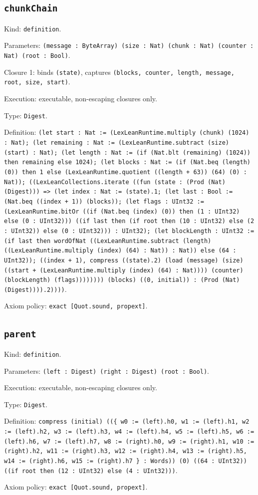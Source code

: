 \documentclass[11pt]{article}
\begin{document}
\subsection*{\texttt{chunkChain}}
\noindent Kind: \texttt{definition}.\par
\noindent Parameters: \texttt{(message : ByteArray) (size : Nat) (chunk : Nat) (counter : Nat) (root : Bool)}.\par
\noindent Closure 1: binds \texttt{(state)}, captures \texttt{(blocks, counter, length, message, root, size, start)}.\par
\noindent Execution: executable, non-escaping closures only.\par
\noindent Type: \texttt{Digest}.\par
\noindent Definition: \texttt{(let start : Nat := (LexLeanRuntime.multiply (chunk) (1024) : Nat); (let remaining : Nat := (LexLeanRuntime.subtract (size) (start) : Nat); (let length : Nat := (if (Nat.blt (remaining) (1024)) then remaining else 1024); (let blocks : Nat := (if (Nat.beq (length) (0)) then 1 else (LexLeanRuntime.quotient ((length + 63)) (64) (0) : Nat)); ((LexLeanCollections.iterate ((fun (state : (Prod (Nat) (Digest))) => (let index : Nat := (state).1; (let last : Bool := (Nat.beq ((index + 1)) (blocks)); (let flags : UInt32 := (LexLeanRuntime.bitOr ((if (Nat.beq (index) (0)) then (1 : UInt32) else (0 : UInt32))) ((if last then (if root then (10 : UInt32) else (2 : UInt32)) else (0 : UInt32))) : UInt32); (let blockLength : UInt32 := (if last then wordOfNat ((LexLeanRuntime.subtract (length) ((LexLeanRuntime.multiply (index) (64) : Nat)) : Nat)) else (64 : UInt32)); ((index + 1), compress ((state).2) (load (message) (size) ((start + (LexLeanRuntime.multiply (index) (64) : Nat)))) (counter) (blockLength) (flags)))))))) (blocks) ((0, initial)) : (Prod (Nat) (Digest)))).2))))}.\par
\noindent Axiom policy: \texttt{exact [Quot.sound, propext]}.\par
\subsection*{\texttt{parent}}
\noindent Kind: \texttt{definition}.\par
\noindent Parameters: \texttt{(left : Digest) (right : Digest) (root : Bool)}.\par
\noindent Execution: executable, non-escaping closures only.\par
\noindent Type: \texttt{Digest}.\par
\noindent Definition: \texttt{compress (initial) ((\{ w0 := (left).h0, w1 := (left).h1, w2 := (left).h2, w3 := (left).h3, w4 := (left).h4, w5 := (left).h5, w6 := (left).h6, w7 := (left).h7, w8 := (right).h0, w9 := (right).h1, w10 := (right).h2, w11 := (right).h3, w12 := (right).h4, w13 := (right).h5, w14 := (right).h6, w15 := (right).h7 \} : Words)) (0) ((64 : UInt32)) ((if root then (12 : UInt32) else (4 : UInt32)))}.\par
\noindent Axiom policy: \texttt{exact [Quot.sound, propext]}.\par
\end{document}

